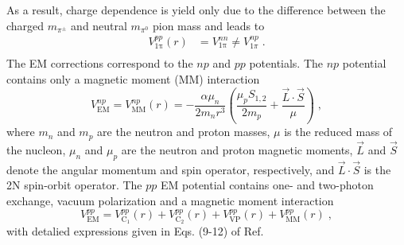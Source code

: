 As a result, charge dependence is yield only due to the difference between the charged $m_{\pi^{\pm}}$ and neutral $m_{\pi^{0}}$ pion mass and leads to
\begin{equation}
\begin{split}
V^{pp}_{\mathrm{\mathrm{1\pi}}}(r) &= V^{nn}_{\mathrm{1\pi}} \neq V^{np}_{1\pi}\;.\\  
\end{split}
\label{eq_35}
\end{equation}
The EM corrections correspond to the $np$ and $pp$ potentials. The $np$ potential contains only a magnetic moment (MM) interaction 
\begin{equation}
V^{np}_{\mathrm{EM}} = V^{np}_{\mathrm{MM}}(r) = -\frac{\alpha\mu_{n}}{2m_{n}r^{3}}\left(\frac{\mu_{p}S_{1,2}}{2m_{p}} + \frac{\vec{L}\cdot\vec{S}}{\mu}\right)\;,
\label{eq_36}
\end{equation}
where $m_{n}$ and $m_{p}$ are the neutron and proton masses, $\mu$ is the reduced mass of the nucleon, $\mu_{n}$ and $\mu_{p}$ are the neutron and proton magnetic moments, $\vec{L}$ and $\vec{S}$ denote the angular momentum and spin operator, respectively, and $\vec{L}\cdot\vec{S}$ is the 2N spin-orbit operator. The $pp$ EM potential contains one- and two-photon exchange, vacuum polarization and a magnetic moment interaction
\begin{equation}
V^{pp}_{\mathrm{EM}} = V^{pp}_{\mathrm{C_{1}}}(r) + V^{pp}_{\mathrm{C_{2}}}(r) + V^{pp}_{\mathrm{VP}}(r) + V^{pp}_{\mathrm{MM}}(r)\;,
\label{eq_37}
\end{equation}
with detalied expressions given in Eqs. (9-12) of Ref.~\cite{Perez2013}
